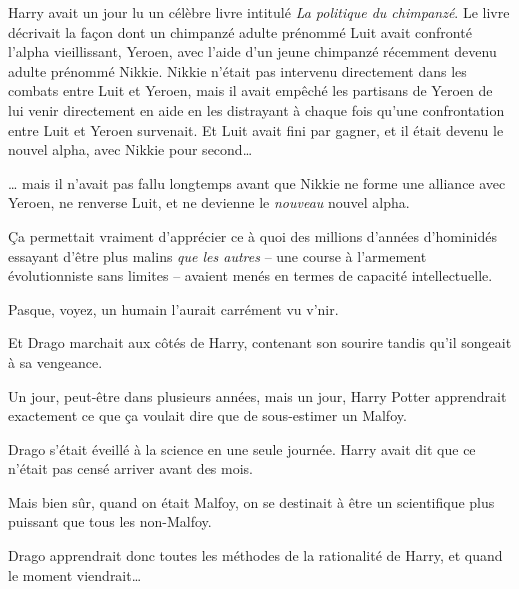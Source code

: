 Harry avait un jour lu un célèbre livre intitulé \emph{La politique du chimpanzé}.
Le livre décrivait la façon dont un chimpanzé adulte prénommé Luit avait confronté l'alpha vieillissant, Yeroen, avec l'aide d'un jeune chimpanzé récemment devenu adulte prénommé Nikkie.
Nikkie n'était pas intervenu directement dans les combats entre Luit et Yeroen, mais il avait empêché les partisans de Yeroen de lui venir directement en aide en les distrayant à chaque fois qu'une confrontation entre Luit et Yeroen survenait.
Et Luit avait fini par gagner, et il était devenu le nouvel alpha, avec Nikkie pour second…

… mais il n'avait pas fallu longtemps avant que Nikkie ne forme une alliance avec Yeroen, ne renverse Luit, et ne devienne le \emph{nouveau} nouvel alpha.

Ça permettait vraiment d'apprécier ce à quoi des millions d'années d'hominidés essayant d'être plus malins \emph{que les autres} -- une course à l'armement évolutionniste sans limites -- avaient menés en termes de capacité intellectuelle.

Pasque, voyez, un humain l'aurait carrément vu v'nir.

\later

Et Drago marchait aux côtés de Harry, contenant son sourire tandis qu'il songeait à sa vengeance.

Un jour, peut-être dans plusieurs années, mais un jour, Harry Potter apprendrait exactement ce que ça voulait dire que de sous-estimer un Malfoy.

Drago s'était éveillé à la science en une seule journée.
Harry avait dit que ce n'était pas censé arriver avant des mois.

Mais bien sûr, quand on était Malfoy, on se destinait à être un scientifique plus puissant que tous les non-Malfoy.

Drago apprendrait donc toutes les méthodes de la rationalité de Harry, et quand le moment viendrait…
